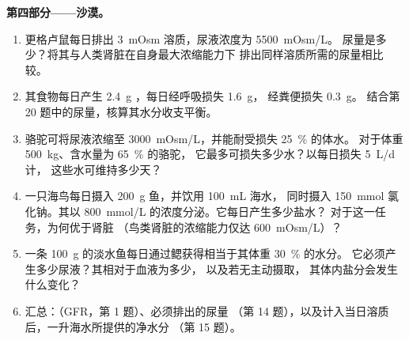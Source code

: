 \begin{problem}
\medskip
\noindent\textbf{第四部分——沙漠。}
\begin{enumerate}[resume]
  \item 更格卢鼠每日排出 \qty{3}{mOsm} 溶质，尿液浓度为 \qty{5500}{mOsm/L}。
        尿量是多少？将其与人类肾脏在自身最大浓缩能力下
        排出同样溶质所需的尿量相比较。
  \item 其食物每日产生 \qty{2.4}{g} ，每日经呼吸损失 \qty{1.6}{g}，
        经粪便损失 \qty{0.3}{g}。
        结合第 20 题中的尿量，核算其水分收支平衡。
  \item 骆驼可将尿液浓缩至 \qty{3000}{mOsm/L}，并能耐受损失 \qty{25}{\%} 的体水。
        对于体重 \qty{500}{kg}、含水量为 \qty{65}{\%} 的骆驼，
        它最多可损失多少水？以每日损失 \qty{5}{L/d} 计，
        这些水可维持多少天？
  \item 一只海鸟每日摄入 \qty{200}{g} 鱼，并饮用 \qty{100}{mL} 海水，
        同时摄入 \qty{150}{mmol} 氯化钠。其以
        \qty{800}{mmol/L} 的浓度分泌。它每日产生多少盐水？
        对于这一任务，为何优于肾脏
        （鸟类肾脏的浓缩能力仅达 \qty{600}{mOsm/L}）？
  \item 一条 \qty{100}{g} 的淡水鱼每日通过鳃获得相当于其体重 \qty{30}{\%} 的水分。
        它必须产生多少尿液？其相对于血液为多少，
        以及若无主动摄取，
        其体内盐分会发生什么变化？
  \item 汇总：（GFR，第 1 题）、必须排出的尿量
        （第 14 题），以及计入当日溶质后，一升海水所提供的净水分
        （第 15 题）。
\end{enumerate}
\end{problem}
